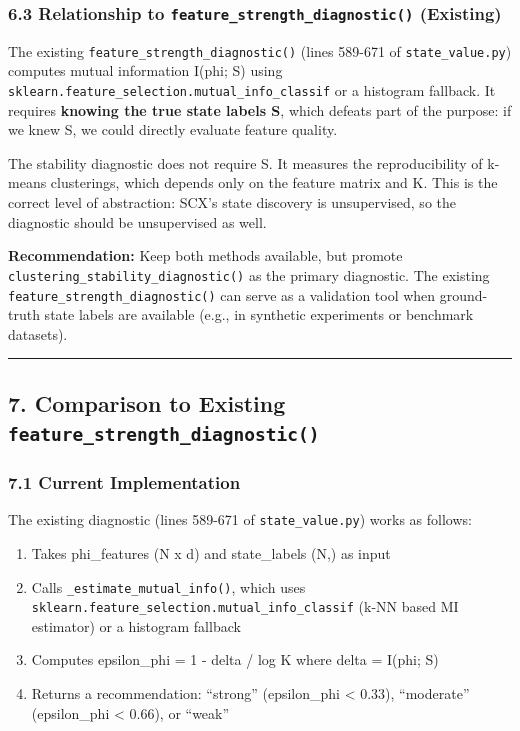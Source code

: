 \documentclass[
  12pt,
]{ctexart}
\providecommand{\tightlist}{%
  \setlength{\itemsep}{0pt}\setlength{\parskip}{0pt}}
\begin{document}
\subsubsection{\texorpdfstring{6.3 Relationship to
\texttt{feature\_strength\_diagnostic()}
(Existing)}{6.3 Relationship to feature\_strength\_diagnostic() (Existing)}}\label{relationship-to-feature_strength_diagnostic-existing}

The existing \texttt{feature\_strength\_diagnostic()} (lines 589-671 of
\texttt{state\_value.py}) computes mutual information I(phi; S) using
\texttt{sklearn.feature\_selection.mutual\_info\_classif} or a histogram
fallback. It requires \textbf{knowing the true state labels S}, which
defeats part of the purpose: if we knew S, we could directly evaluate
feature quality.

The stability diagnostic does not require S. It measures the
reproducibility of k-means clusterings, which depends only on the
feature matrix and K. This is the correct level of abstraction: SCX's
state discovery is unsupervised, so the diagnostic should be
unsupervised as well.

\textbf{Recommendation:} Keep both methods available, but promote
\texttt{clustering\_stability\_diagnostic()} as the primary diagnostic.
The existing \texttt{feature\_strength\_diagnostic()} can serve as a
validation tool when ground-truth state labels are available (e.g., in
synthetic experiments or benchmark datasets).

\begin{center}\rule{0.5\linewidth}{0.5pt}\end{center}

\subsection{\texorpdfstring{7. Comparison to Existing
\texttt{feature\_strength\_diagnostic()}}{7. Comparison to Existing feature\_strength\_diagnostic()}}\label{comparison-to-existing-feature_strength_diagnostic}

\subsubsection{7.1 Current Implementation}\label{current-implementation}

The existing diagnostic (lines 589-671 of \texttt{state\_value.py})
works as follows:

\begin{enumerate}
\def\labelenumi{\arabic{enumi}.}
\tightlist
\item
  Takes phi\_features (N x d) and state\_labels (N,) as input
\item
  Calls \texttt{\_estimate\_mutual\_info()}, which uses
  \texttt{sklearn.feature\_selection.mutual\_info\_classif} (k-NN based
  MI estimator) or a histogram fallback
\item
  Computes epsilon\_phi = 1 - delta / log K where delta = I(phi; S)
\item
  Returns a recommendation: ``strong'' (epsilon\_phi \textless{} 0.33),
  ``moderate'' (epsilon\_phi \textless{} 0.66), or ``weak''
\end{enumerate}
\end{document}
